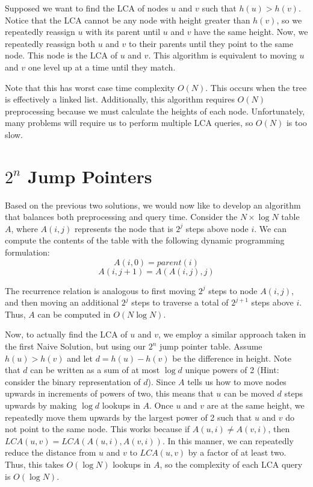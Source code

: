 \documentclass{article}
\begin{document}
Supposed we want to find the LCA of nodes $u$ and $v$ such that $h(u)>h(v)$. Notice that the LCA cannot be any node with height greater than $h(v)$, so we repeatedly reassign $u$ with its parent until $u$ and $v$ have the same height. Now, we repeatedly reassign both $u$ and $v$ to their parents until they point to the same node. This node is the LCA of $u$ and $v$. This algorithm is equivalent to moving $u$ and $v$ one level up at a time until they match.

Note that this has worst case time complexity $O(N)$. This occurs when the tree is effectively a linked list. Additionally, this algorithm requires $O(N)$ preprocessing because we must calculate the heights of each node. Unfortunately, many problems will require us to perform multiple LCA queries, so $O(N)$ is too slow. 


\section {$2^n$ Jump Pointers}

Based on the previous two solutions, we would now like to develop an algorithm that balances both preprocessing and query time. Consider the $N \times \log N$ table $A$, where $A(i, j)$ represents the node that is $2^j$ steps above node $i$. We can compute the contents of the table with the following dynamic programming formulation: 
$$A(i, 0) = parent(i)$$
$$A(i, j+1) = A( A(i, j), j )$$

\noindent The recurrence relation is analogous to first moving $2^j$ steps to node $A(i, j)$, and then moving an additional $2^j$ steps to traverse a total of $2^{j+1}$ steps above $i$. Thus, $A$ can be computed in $O(N \log N)$. 

Now, to actually find the LCA of $u$ and $v$, we employ a similar approach taken in the first Naive Solution, but using our $2^n$ jump pointer table. Assume $h(u) > h(v)$ and let $d = h(u) - h(v)$ be the difference in height. Note that $d$ can be written as a sum of at most $\log d$ unique powers of 2 (Hint: consider the binary representation of $d$). Since $A$ tells us how to move nodes upwards in increments of powers of two, this means that $u$ can be moved $d$ steps upwards by making $\log d$ lookups in $A$. Once $u$ and $v$ are at the same height, we repeatedly move them upwards by the largest power of 2 such that $u$ and $v$ do not point to the same node. This works because if $A(u, i) \neq A(v, i)$, then $LCA(u, v) = LCA(A(u, i), A(v, i))$. In this manner, we can repeatedly reduce the distance from $u$ and $v$ to $LCA(u, v)$ by a factor of at least two.  Thus, this takes $O(\log N)$ lookups in $A$, so the complexity of each LCA query is $O(\log N)$. 
\end{document}
